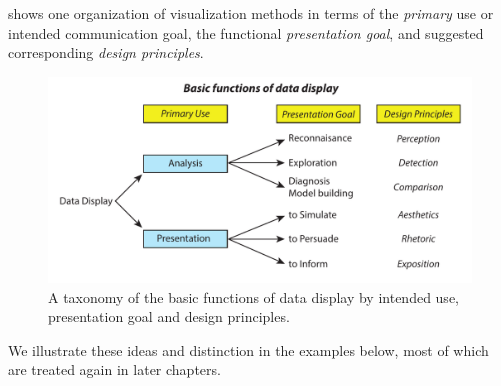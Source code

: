 \documentclass[11pt]{book}
\begin{document}
shows one organization of visualization methods in terms
of the \emph{primary} use or intended communication goal,
the functional \emph{presentation goal}, and suggested corresponding
\emph{design principles}.
\begin{figure}[htbp]
  \centering 
  \includegraphics[width=\textwidth]{ch01/fig/datadisp}
  \caption[Basic functions of data display]{A taxonomy of the basic functions of data display by intended use, presentation goal and design principles.}\label{fig:datadisp}
\end{figure}

We illustrate these ideas and distinction in the examples below, most of which
are treated again in later chapters.
\end{document}

